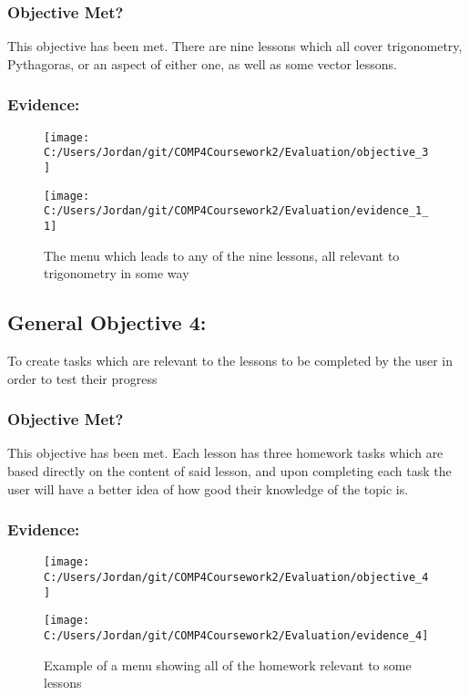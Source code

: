 \subsubsection{Objective Met?}

This objective has been met. There are nine lessons which all cover trigonometry, Pythagoras, or an aspect of either one, as well as some vector lessons.

\subsubsection{Evidence: }

\begin{figure}[H]
	\texttt{[image: C:/Users/Jordan/git/COMP4Coursework2/Evaluation/objective\_3]}
\end{figure}

\begin{figure}[H]
	\texttt{[image: C:/Users/Jordan/git/COMP4Coursework2/Evaluation/evidence\_1\_1]}
	\caption{The menu which leads to any of the nine lessons, all relevant to trigonometry in some way}
\end{figure}

\subsection{General Objective 4: }

To create tasks which are relevant to the lessons to be completed by the user in order to test their progress

\subsubsection{Objective Met?}

This objective has been met. Each lesson has three homework tasks which are based directly on the content of said lesson, and upon completing each task the user will have a better idea of how good their knowledge of the topic is.

\subsubsection{Evidence: }

\begin{figure}[H]
	\texttt{[image: C:/Users/Jordan/git/COMP4Coursework2/Evaluation/objective\_4]}
\end{figure}

\begin{figure}[H]
	\texttt{[image: C:/Users/Jordan/git/COMP4Coursework2/Evaluation/evidence\_4]}
	\caption{Example of a menu showing all of the homework relevant to some lessons}
\end{figure}

